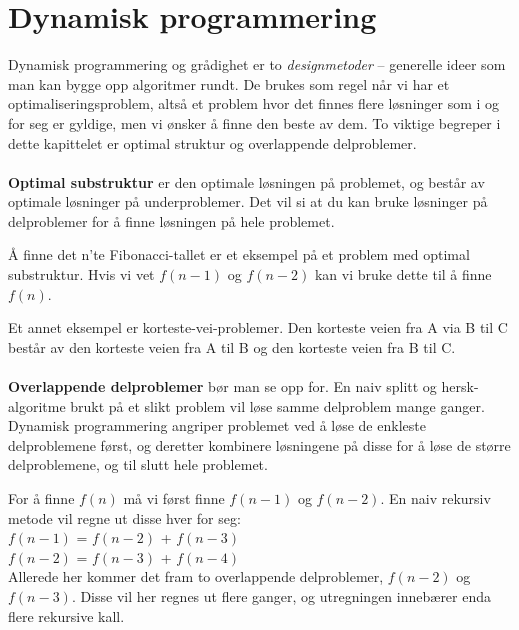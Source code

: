 \section{Dynamisk programmering}
Dynamisk programmering og grådighet  er to \textit{designmetoder} – generelle ideer som man kan bygge opp algoritmer rundt. De brukes som regel når vi har et optimaliseringsproblem, altså et problem hvor det finnes flere løsninger som i og for seg er gyldige, men vi ønsker å finne den beste av dem. To viktige begreper i dette kapittelet er optimal struktur og overlappende delproblemer.
\\\\
\textbf{Optimal substruktur} er den optimale løsningen på problemet, og består av optimale løsninger på underproblemer. Det vil si at du kan bruke løsninger på delproblemer for å finne løsningen på hele problemet.

\begin{boxed}
Å finne det n'te Fibonacci-tallet er et eksempel på et problem med optimal substruktur. Hvis vi vet $f(n - 1)$ og $f(n - 2)$ kan vi bruke dette til å finne $f(n)$.
\end{boxed}

\noindent Et annet eksempel er korteste-vei-problemer. Den korteste veien fra A via B til C består av den korteste veien fra A til B og den korteste veien fra B til C. 
\\\\
\textbf{Overlappende delproblemer} bør man se opp for. En naiv splitt og hersk-algoritme brukt på et slikt problem vil løse samme delproblem mange ganger. Dynamisk programmering angriper problemet ved å løse de enkleste delproblemene først, og deretter kombinere løsningene på disse for å løse de større delproblemene, og til slutt hele problemet.

\begin{boxed}
For å finne $f(n)$ må vi først finne $f(n - 1)$ og $f(n - 2)$. En naiv rekursiv metode vil regne ut disse hver for seg:\\
\newline
$f(n - 1)$ = $f(n - 2)$ + $f(n - 3)$\\ 
$f(n - 2)$ = $f(n - 3)$ + $f(n - 4)$\\ 
\newline
Allerede her kommer det fram to overlappende delproblemer, $f(n - 2)$ og $f(n - 3)$. Disse vil her regnes ut flere ganger, og utregningen innebærer enda flere rekursive kall. 
\end{boxed}

